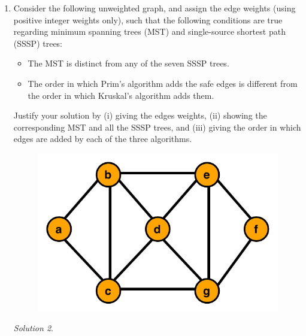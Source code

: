 \documentclass[12pt]{article}
\theoremstyle{remark}
\newtheorem*{solution}{Solution}
\begin{document}
\begin{enumerate}
\begin{enumerate}[label=(\alph*)]
\begin{solution}
\end{solution}
 
\end{enumerate}

\item Consider the following unweighted graph, and assign the edge weights (using positive integer weights only), such that the following conditions are true regarding minimum spanning trees (MST) and single-source shortest path (SSSP) trees:
	\begin{itemize}
	\itemsep-0.1pt
	\item The MST is distinct from any of the seven SSSP trees.
	\item The order in which Prim's algorithm adds the safe edges is different from the order in which Kruskal's algorithm adds them.
	\end{itemize}
	Justify your solution by (i) giving the edges weights, (ii) showing the corresponding MST and all the SSSP trees, and (iii) giving the order in which edges are added by each of the three algorithms. 	
	\begin{figure}[h!]
\begin{center}
\includegraphics[scale=0.6]{graph_mst.pdf} 
\end{center}
\end{figure}

\begin{solution}

\end{solution}

\end{enumerate}
\end{document}
